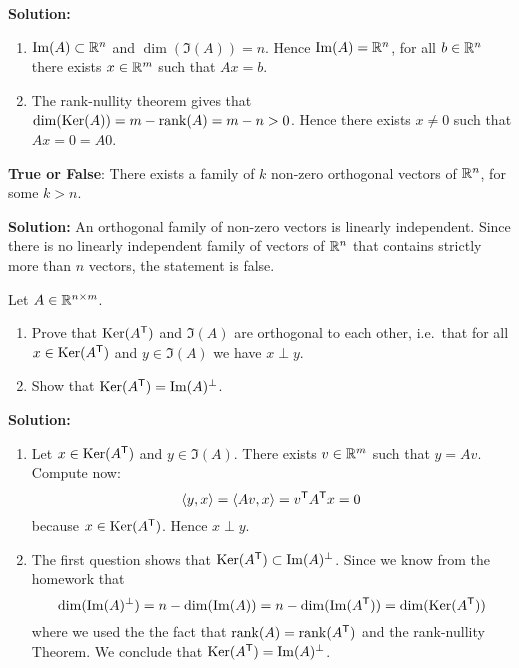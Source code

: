 \documentclass[11pt,nocut]{article}
\begin{document}
\textbf{Solution:}

	\begin{enumerate}
		\item ${{\rm Im}}(A) \subset \mathbb{R}^n$ and $\dim(\Im(A)) = n$. Hence ${{\rm Im}}(A) = \mathbb{R}^n$, for all $b \in \mathbb{R}^n$ there exists $x \in \mathbb{R}^m$ such that $Ax=b$.
		\item The rank-nullity theorem gives that ${{\rm dim}}({{\rm Ker}}(A)) = m - {{\rm rank}}(A) = m-n > 0$. Hence there exists $x \neq 0$ such that $Ax=0=A0$.
	\end{enumerate}

\vspace{0.2cm}
\begin{problem}
	\textbf{True or False}: There exists a family of $k$ non-zero orthogonal vectors of $\mathbb{R}^n$, for some $k>n$.
\end{problem}

\textbf{Solution:}
An orthogonal family of non-zero vectors is linearly independent. Since there is no linearly independent family of vectors of $\mathbb{R}^n$ that contains strictly more than $n$ vectors, the statement is false.

\vspace{0.2cm}

\begin{problem}
	Let $A \in \mathbb{R}^{n \times m}$.
	\begin{enumerate}
		\item Prove that ${{\rm Ker}}(A^{{\sf T}})$ and $\Im(A)$ are orthogonal to each other, i.e.\ that for all $x \in {{\rm Ker}}(A^{{\sf T}})$ and $y \in \Im(A)$ we have $x \perp y$.
		\item Show that ${{\rm Ker}}(A^{{\sf T}}) = {{\rm Im}}(A)^{\perp}$.
	\end{enumerate}
\end{problem}

\textbf{Solution:}
	\begin{enumerate}
		\item Let $x \in {{\rm Ker}}(A^{{\sf T}})$ and $y \in \Im(A)$. There exists $v \in \mathbb{R}^m$ such that $y = Av$. Compute now:
			$$
			\langle y,x \rangle = 
			\langle Av,x \rangle = 
			v^{{\sf T}} A^{{\sf T}} x = 0
			$$
			because $x \in {{\rm Ker}}(A^{{\sf T}})$. Hence $x \perp y$.
		\item The first question shows that ${{\rm Ker}}(A^{{\sf T}}) \subset {{\rm Im}}(A)^{\perp}$. Since we know from the homework that 
			$$
			{{\rm dim}}({{\rm Im}}(A)^{\perp}) = n - {{\rm dim}}({{\rm Im}}(A)) = n - {{\rm dim}}({{\rm Im}}(A^{{\sf T}}))
			= {{\rm dim}}({{\rm Ker}}(A^{{\sf T}}))
			$$
			where we used the the fact that ${{\rm rank}}(A) = {{\rm rank}}(A^{{\sf T}})$ and the rank-nullity Theorem. We conclude that ${{\rm Ker}}(A^{{\sf T}}) = {{\rm Im}}(A)^{\perp}$.
	\end{enumerate}
\end{document}
